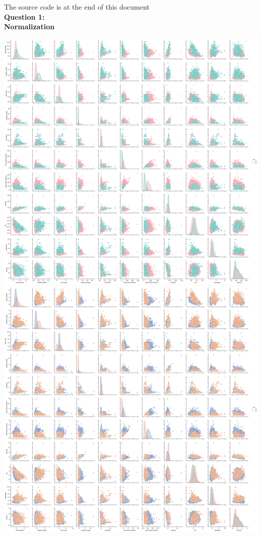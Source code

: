 \documentclass[12pt]{article}
\begin{document}
\noindent
{\LARGE The source code is at the end of this document}\\
\textbf{\large Question 1:}\\
\textbf{Normalization}
\begin{center}
    \includegraphics[width=17cm]{../plots/Q1_no_normalization.png}
    \includegraphics[width=17cm]{../plots/Q1_zscore_normalization.png}
\end{center}
\end{document}
